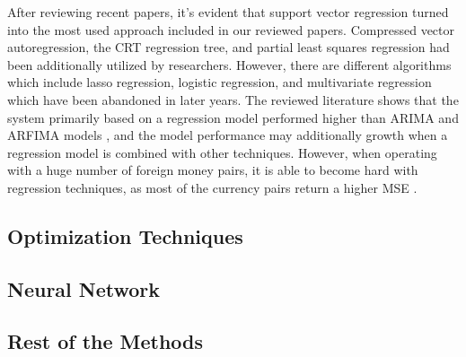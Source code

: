 After reviewing recent papers, it's evident that support vector regression turned into the most used approach included in our reviewed papers. Compressed vector autoregression, the CRT regression tree, and partial least squares regression had been additionally utilized by researchers. However, there are different algorithms which include lasso regression, logistic regression, and multivariate regression which have been abandoned in later years. 
The reviewed literature shows that the system primarily based on a regression model performed higher than ARIMA and ARFIMA models \cite{Raimundo18}, and the model performance may additionally growth \cite{Achchab17} when a regression model is combined with other techniques. However, when operating with a huge number of foreign money pairs, it is able to become hard with regression techniques, as most of the currency pairs return a higher MSE \citep{Taveeapiradeecharoen19}.

\subsection{Optimization Techniques}

\subsection{Neural Network}

\subsection{Rest of the Methods}
